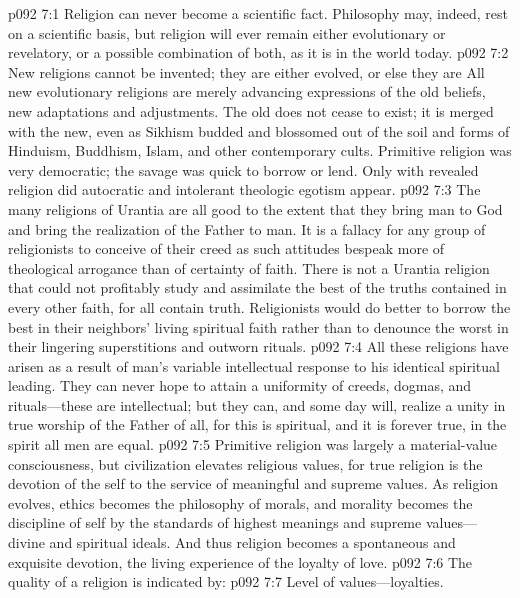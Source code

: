\vs p092 7:1 Religion can never become a scientific fact. Philosophy may, indeed, rest on a scientific basis, but religion will ever remain either evolutionary or revelatory, or a possible combination of both, as it is in the world today.\plusone
\vs p092 7:2 New religions cannot be invented; they are either evolved, or else they are  All new evolutionary religions are merely advancing expressions of the old beliefs, new adaptations and adjustments. The old does not cease to exist; it is merged with the new, even as Sikhism budded and blossomed out of the soil and forms of Hinduism, Buddhism, Islam, and other contemporary cults. Primitive religion was very democratic; the savage was quick to borrow or lend. Only with revealed religion did autocratic and intolerant theologic egotism appear.
\vs p092 7:3 The many religions of Urantia are all good to the extent that they bring man to God and bring the realization of the Father to man. It is a fallacy for any group of religionists to conceive of their creed as  such attitudes bespeak more of theological arrogance than of certainty of faith. There is not a Urantia religion that could not profitably study and assimilate the best of the truths contained in every other faith, for all contain truth. Religionists would do better to borrow the best in their neighbors’ living spiritual faith rather than to denounce the worst in their lingering superstitions and outworn rituals.
\vs p092 7:4 All these religions have arisen as a result of man’s variable intellectual response to his identical spiritual leading. They can never hope to attain a uniformity of creeds, dogmas, and rituals---these are intellectual; but they can, and some day will, realize a unity in true worship of the Father of all, for this is spiritual, and it is forever true, in the spirit all men are equal.
\pc \vs p092 7:5 Primitive religion was largely a material\hyp{}value consciousness, but civilization elevates religious values, for true religion is the devotion of the self to the service of meaningful and supreme values. As religion evolves, ethics becomes the philosophy of morals, and morality becomes the discipline of self by the standards of highest meanings and supreme values---divine and spiritual ideals. And thus religion becomes a spontaneous and exquisite devotion, the living experience of the loyalty of love.
\vs p092 7:6 The quality of a religion is indicated by:
\pc \vs p092 7:7 \bibnobreakspace Level of values---loyalties.
